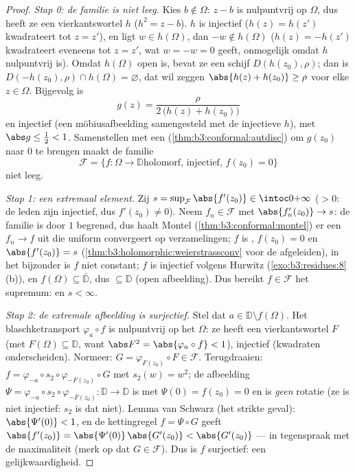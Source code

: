 \begin{proof}
\emph{Stap 0: de familie is niet leeg.} Kies $b \notin \Omega$:
$z - b$ is nulpuntvrij op $\Omega$, dus heeft ze een 
vierkantswortel $h$ ($h^2 = z - b$). $h$ is injectief ($h(z) =
h(z')$ kwadrateert tot $z = z'$), en ligt $w \in h(\Omega)$, dan
$-w \notin h(\Omega)$ ($h(z) = -h(z')$ kwadrateert eveneens tot
$z = z'$, wat $w = -w = 0$ geeft, onmogelijk omdat $h$
nulpuntvrij is). Omdat $h(\Omega)$ open is, bevat ze een schijf
$D(h(z_0), \rho)$; dan is $D(-h(z_0), \rho) \cap h(\Omega) =
\varnothing$, dat wil zeggen $\abs{h(z) + h(z_0)} \geq \rho$ voor
elke $z \in \Omega$. Bijgevolg is
\[
g(z) = \frac{\rho}{2\,\bigl(h(z) + h(z_0)\bigr)}
\]
 en injectief (een möbiusafbeelding samengesteld met de
injectieve $h$), met $\abs g \leq \frac12 < 1$. Samenstellen met
een  (\cref{thm:b3:conformal:autdisc}) om $g(z_0)$
naar $0$ te brengen maakt de familie
\[
\mathcal F = \{f \colon \Omega \to \mathbb D \text{
holomorf, injectief, } f(z_0) = 0\}
\]
niet leeg.

\emph{Stap 1: een extremaal element.} Zij $s =
\sup_{\mathcal F}\abs{f'(z_0)} \in \intoc0{+\infty}$ ($> 0$: de
leden zijn injectief, dus $f'(z_0) \neq 0$). Neem $f_n \in
\mathcal F$ met $\abs{f_n'(z_0)} \to s$: de familie is door $1$
begrensd, dus haalt Montel (\cref{thm:b3:conformal:montel}) er
een $f_n \to f$ uit die uniform convergeert op 
verzamelingen; $f$ is , $f(z_0) = 0$ en $\abs{f'(z_0)} =
s$ (\cref{thm:b3:holomorphic:weierstrassconv} voor de
afgeleiden), in het bijzonder is $f$ niet constant; $f$ is
injectief volgens Hurwitz (\cref{exo:b3:residues:8}(b)), en
$f(\Omega) \subseteq \bar{\mathbb D}$, dus $\subseteq \mathbb D$
(open afbeelding). Dus bereikt $f \in \mathcal F$ het supremum:
en $s < \infty$.

\emph{Stap 2: de extremale afbeelding is surjectief.} Stel dat $a
\in \mathbb D\setminus f(\Omega)$. Het blaschketransport
$\varphi_a\circ f$ is nulpuntvrij op het  $\Omega$: ze heeft een  vierkantswortel
$F$ (met $F(\Omega) \subseteq \mathbb D$, want $\abs F^2 =
\abs{\varphi_a\circ f} < 1$), injectief (kwadraten
onderscheiden). Normeer: $G = \varphi_{F(z_0)}\circ F \in
\mathcal F$. Terugdraaien: $f = \varphi_{-a}\circ s_2 \circ
\varphi_{-F(z_0)}\circ G$ met $s_2(w) = w^2$; de afbeelding $\Psi
= \varphi_{-a}\circ s_2\circ\varphi_{-F(z_0)} \colon \mathbb D
\to \mathbb D$ is  met $\Psi(0) = f(z_0) = 0$ en is
\emph{geen} rotatie (ze is niet injectief: $s_2$ is dat niet).
Lemma van Schwarz (het strikte geval): $\abs{\Psi'(0)} < 1$, en
de kettingregel $f = \Psi\circ G$ geeft $\abs{f'(z_0)} =
\abs{\Psi'(0)}\,\abs{G'(z_0)} < \abs{G'(z_0)}$ --- in tegenspraak
met de maximaliteit (merk op dat $G \in \mathcal F$). Dus is $f$
surjectief: een  gelijkwaardigheid.


\end{proof}
